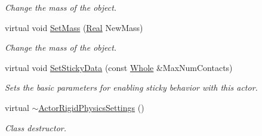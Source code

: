 \begin{DoxyCompactItemize}
\begin{DoxyCompactList}\small\item\em Change the mass of the object. \item\end{DoxyCompactList}\item 
virtual void \hyperlink{classMezzanine_1_1ActorRigidPhysicsSettings_a9b2ed9808e7b4a7c8874f33c51fb8ca1}{SetMass} (\hyperlink{namespaceMezzanine_a726731b1a7df72bf3583e4a97282c6f6}{Real} NewMass)
\begin{DoxyCompactList}\small\item\em Change the mass of the object. \item\end{DoxyCompactList}\item 
virtual void \hyperlink{classMezzanine_1_1ActorRigidPhysicsSettings_a2c090930426361a573ba939ac9580bce}{SetStickyData} (const \hyperlink{namespaceMezzanine_adcbb6ce6d1eb4379d109e51171e2e493}{Whole} \&MaxNumContacts)
\begin{DoxyCompactList}\small\item\em Sets the basic parameters for enabling sticky behavior with this actor. \item\end{DoxyCompactList}\item 
\hypertarget{classMezzanine_1_1ActorRigidPhysicsSettings_a56d106b78dfa0ea5415c7928491e4fa7}{
virtual \hyperlink{classMezzanine_1_1ActorRigidPhysicsSettings_a56d106b78dfa0ea5415c7928491e4fa7}{$\sim$ActorRigidPhysicsSettings} ()}
\label{classMezzanine_1_1ActorRigidPhysicsSettings_a56d106b78dfa0ea5415c7928491e4fa7}

\begin{DoxyCompactList}\small\item\em Class destructor. \item\end{DoxyCompactList}\end{DoxyCompactItemize}
